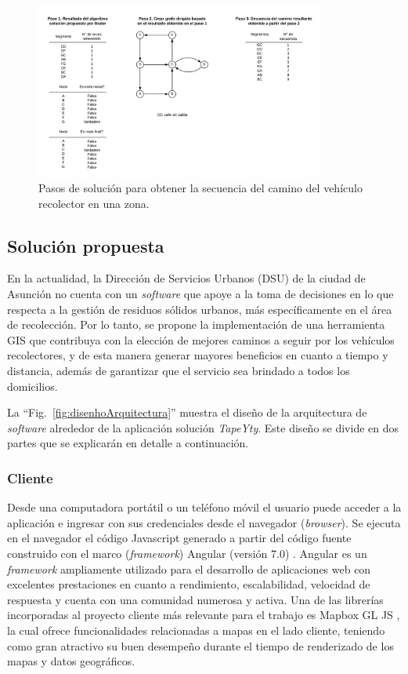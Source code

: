 \documentclass[spanish, conference]{IEEEtran}
\begin{document}
\begin{figure}[htbp]
\centerline{\includegraphics[width=0.85\textwidth]{imagenes/pasos_de_solucion.png}}
\caption{Pasos de solución para obtener la secuencia del camino del vehículo recolector en una zona.}
\label{fig:PasosSolucion}
\end{figure}

\subsection{Solución propuesta}

En la actualidad, la Dirección de Servicios Urbanos (DSU) de la ciudad de Asunción no cuenta con un \textit{software} que apoye a la toma de decisiones en lo que respecta a la gestión de residuos sólidos urbanos, más específicamente en el área de recolección. Por lo tanto, se propone la implementación de una herramienta GIS que contribuya con la elección de mejores caminos a seguir por los vehículos recolectores, y de esta manera generar mayores beneficios en cuanto a tiempo y distancia, además de garantizar que el servicio sea brindado a todos los domicilios.

La ``Fig.~\ref{fig:disenhoArquitectura}'' muestra el diseño de la arquitectura de \textit{software} alrededor de la aplicación solución \textit{TapeYty}. Este diseño se divide en dos partes que se explicarán en detalle a continuación.

\subsubsection{Cliente}

Desde una computadora portátil o un teléfono móvil el usuario puede acceder a la aplicación e ingresar con sus credenciales desde el navegador (\textit{browser}). Se ejecuta en el navegador el código Javascript generado a partir del código fuente construido con el marco (\textit{framework}) Angular (versión 7.0) \cite{Angular}. Angular es un \textit{framework} ampliamente utilizado para el desarrollo de aplicaciones web con excelentes prestaciones en cuanto a rendimiento, escalabilidad, velocidad de respuesta y cuenta con una comunidad numerosa y activa. Una de las librerías incorporadas al proyecto cliente más relevante para el trabajo es Mapbox GL JS \cite{MapboxJS}, la cual ofrece funcionalidades relacionadas a mapas en el lado cliente, teniendo como gran atractivo su buen desempeño durante el tiempo de renderizado de los mapas y datos geográficos.
\end{document}
